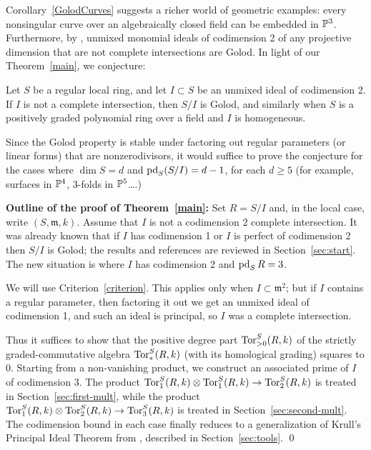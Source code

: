 \documentclass[11pt]{amsart}
\def\gm{{\mathfrak m}}
\begin{document}
Corollary~\ref{GolodCurves} suggests a  richer world of geometric examples: every nonsingular curve over an algebraically closed field can be embedded in ${\mathbb P}^3$.
Furthermore, by \cite[Corollary~3.8 and Lemma~2.14(1)]{BCD}, unmixed monomial ideals of codimension 2 of any projective dimension that are not complete intersections are Golod. In light of our Theorem~\ref{main}, we conjecture:

\begin{conjecture}
 Let $S$ be a regular local ring, and let $I\subset S$ be an unmixed ideal of codimension 2. If $I$ is not a complete intersection, then $S/I$ is Golod, and similarly when $S$ is a positively graded polynomial ring over a field and $I$ is homogeneous.
\end{conjecture}

Since the Golod property is stable under factoring out regular parameters (or linear forms) that are nonzerodivisors, it would suffice to prove the conjecture for the cases where $\dim S = d$ and $\operatorname{pd}_{S}(S/I) = d-1$, for each $d\geq 5$ (for example, surfaces in ${\mathbb P}^{4}$, 3-folds in ${\mathbb P}^{5}$\dots.)

\noindent\textbf{Outline of the proof of Theorem~\ref{main}:} Set $R=S/I$ and, in the local case, write $(S,\gm,k)$. Assume that $I$ is not a codimension 2 complete intersection. It was already known that if $I$ has codimension 1 or $I$ is perfect of codimension 2 then $S/I$ is Golod; the results and references are reviewed in Section~\ref{sec:start}. The new situation is where $I$ has codimension 2 and 
$\operatorname{pd}_S R = 3$. 

We will use Criterion~\ref{criterion}. This
applies only when $I\subset \gm^{2}$; but if $I$ contains a regular
parameter, then factoring it out we get an unmixed ideal of codimension 1, and such an ideal is principal, so $I$ was a complete intersection. 

Thus it suffices to show that the positive degree part $\operatorname{Tor}^S_{>0}(R,k)$ of the strictly graded-commutative algebra $\operatorname{Tor}^S_*(R,k)$ (with its homological grading)
 squares to 0. Starting from a non-vanishing product, we construct an associated prime of $I$ of codimension 3. The product $\operatorname{Tor}_1^S(R,k) \otimes \operatorname{Tor}_1^S(R,k) \to \operatorname{Tor}_2^S(R,k)$ is treated in Section~\ref{sec:first-mult}, while the product $\operatorname{Tor}_1^S(R,k) \otimes \operatorname{Tor}_2^S(R,k) \to \operatorname{Tor}_3^S(R,k)$ is treated in Section~\ref{sec:second-mult}. The codimension
bound in each case finally reduces to a generalization of Krull's Principal Ideal Theorem from \cite{EisenbudEvans},
described in Section~\ref{sec:tools}. \qed
\end{document}
